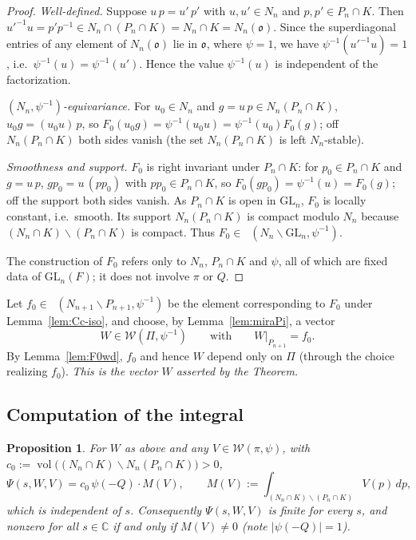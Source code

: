 \documentclass[12pt]{article}
\newcommand{\GL}{\mathrm{GL}}
\newcommand{\oo}{\mathfrak{o}}
\newcommand{\Wmod}{\mathcal{W}}
\DeclareMathOperator{\Cc}{C_c^\infty}
\newtheorem{proposition}{Proposition}
\begin{document}
\begin{proof}
\emph{Well-defined.} Suppose $u\,p=u'\,p'$ with $u,u'\in N_n$ and $p,p'\in P_n\cap K$.
Then $u'^{-1}u=p'p^{-1}\in N_n\cap(P_n\cap K)=N_n\cap K=N_n(\oo)$. Since the
superdiagonal entries of any element of $N_n(\oo)$ lie in $\oo$, where $\psi=1$, we
have $\psi^{-1}(u'^{-1}u)=1$, i.e.\ $\psi^{-1}(u)=\psi^{-1}(u')$. Hence the value
$\psi^{-1}(u)$ is independent of the factorization.

\emph{$(N_n,\psi^{-1})$-equivariance.} For $u_0\in N_n$ and $g=u\,p\in
N_n(P_n\cap K)$, $u_0g=(u_0u)\,p$, so $F_0(u_0g)=\psi^{-1}(u_0u)=\psi^{-1}(u_0)F_0(g)$;
off $N_n(P_n\cap K)$ both sides vanish (the set $N_n(P_n\cap K)$ is left
$N_n$-stable).

\emph{Smoothness and support.} $F_0$ is right invariant under $P_n\cap K$: for
$p_0\in P_n\cap K$ and $g=u\,p$, $g p_0=u\,(p p_0)$ with $p p_0\in P_n\cap K$, so
$F_0(gp_0)=\psi^{-1}(u)=F_0(g)$; off the support both sides vanish. As $P_n\cap K$
is open in $\GL_n$, $F_0$ is locally constant, i.e.\ smooth. Its support
$N_n(P_n\cap K)$ is compact modulo $N_n$ because $(N_n\cap K)\backslash(P_n\cap K)$
is compact. Thus $F_0\in\Cc(N_n\backslash\GL_n,\psi^{-1})$.

The construction of $F_0$ refers only to $N_n$, $P_n\cap K$ and $\psi$, all of which
are fixed data of $\GL_n(F)$; it does not involve $\pi$ or $Q$.
\end{proof}

Let $f_0\in\Cc(N_{n+1}\backslash P_{n+1},\psi^{-1})$ be the element corresponding to
$F_0$ under Lemma~\ref{lem:Cc-iso}, and choose, by Lemma~\ref{lem:miraPi}, a vector
\[
  W\in\Wmod(\Pi,\psi^{-1})\qquad\text{with}\qquad W|_{P_{n+1}}=f_0 .
\]
By Lemma~\ref{lem:F0wd}, $f_0$ and hence $W$ depend only on $\Pi$ (through the choice
realizing $f_0$). \emph{This is the vector $W$ asserted by the Theorem.}

\subsection{Computation of the integral}

\begin{proposition}\label{prop:collapse}
For $W$ as above and any $V\in\Wmod(\pi,\psi)$, with
$c_0:=\operatorname{vol}\bigl((N_n\cap K)\backslash N_n(P_n\cap K)\bigr)>0$,
\begin{equation}\label{eq:collapse}
  \Psi(s,W,V)=c_0\,\psi(-Q)\cdot M(V),\qquad
  M(V):=\int_{(N_n\cap K)\backslash(P_n\cap K)}V(p)\,dp ,
\end{equation}
which is independent of $s$. Consequently $\Psi(s,W,V)$ is finite for every $s$, and
nonzero for all $s\in\mathbb C$ if and only if $M(V)\neq0$ (note $|\psi(-Q)|=1$).
\end{proposition}
\end{document}
